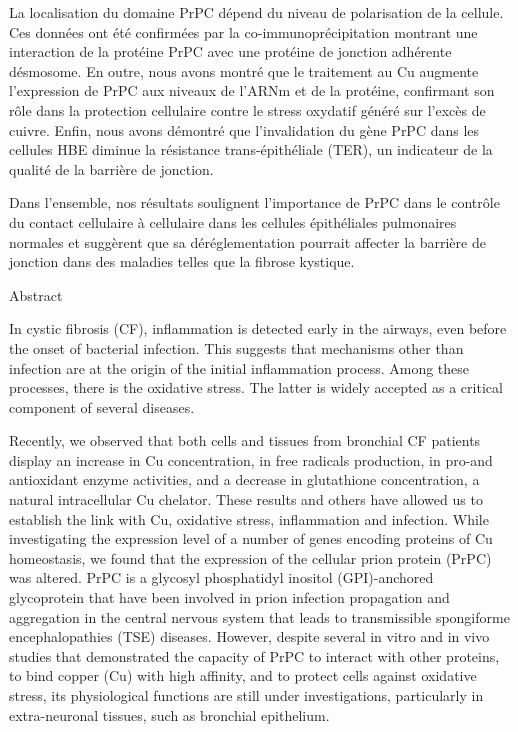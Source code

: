 La localisation du domaine PrPC dépend du niveau de polarisation de la cellule. Ces données ont été confirmées par la co-immunoprécipitation montrant une interaction de la protéine PrPC avec une protéine de jonction adhérente désmosome. En outre, nous avons montré que le traitement au Cu augmente l'expression de PrPC aux niveaux de l'ARNm et de la protéine, confirmant son rôle dans la protection cellulaire contre le stress oxydatif généré sur l'excès de cuivre. Enfin, nous avons démontré que l'invalidation du gène PrPC dans les cellules HBE diminue la résistance trans-épithéliale (TER), un indicateur de la qualité de la barrière de jonction.

Dans l'ensemble, nos résultats soulignent l'importance de PrPC dans le contrôle du contact cellulaire à cellulaire dans les cellules épithéliales pulmonaires normales et suggèrent que sa déréglementation pourrait affecter la barrière de jonction dans des maladies telles que la fibrose kystique.

\vspace*{20mm}

\renewcommand{\abstractname}{Abstract}
{\abstractname}\label{sec:abstract-diff} 

In cystic fibrosis (CF), inflammation is detected early in the airways, even before the onset of bacterial infection. This suggests that mechanisms other than infection are at the origin of the initial inflammation process. Among these processes, there is the oxidative stress. The latter is widely accepted as a critical component of several diseases.

Recently, we observed that both cells and tissues from bronchial CF patients display an increase in Cu concentration, in free radicals production, in pro-and antioxidant enzyme activities, and a decrease in glutathione concentration, a natural intracellular Cu chelator. These results and others have allowed us to establish the link with Cu, oxidative stress, inflammation and infection.
While investigating the expression level of a number of genes encoding proteins of Cu homeostasis, we found that the expression of the cellular prion protein (PrPC) was altered. PrPC is a glycosyl phosphatidyl inositol (GPI)-anchored glycoprotein that have been involved in prion infection propagation and aggregation in the central nervous system that leads to transmissible spongiforme encephalopathies (TSE) diseases. 
However, despite several in vitro and in vivo studies that demonstrated the capacity of PrPC to interact with other proteins, to bind copper (Cu) with high affinity, and to protect cells against oxidative stress, its physiological functions are still under investigations, particularly in extra-neuronal tissues, such as bronchial epithelium.

